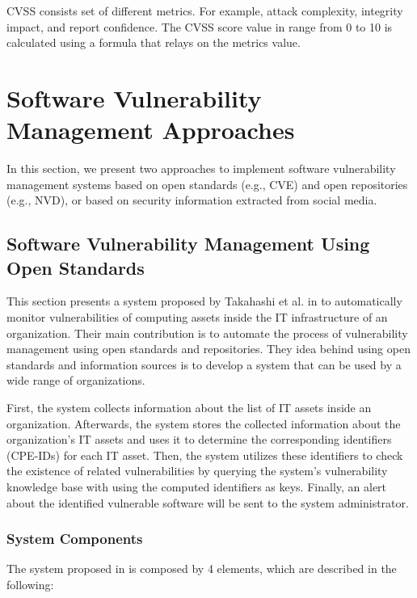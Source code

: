 \documentclass{llncs}
\begin{document}
 \par CVSS consists set of different metrics. For example, attack complexity, integrity impact, and report confidence. The CVSS score value in range from 0 to 10  is calculated using a formula that relays on the metrics value.

\section{Software	Vulnerability	Management	Approaches}
 
 In this section, we present two approaches to implement software vulnerability management systems based on  open standards (e.g., CVE) and open repositories (e.g., NVD), or based on  security information extracted from social media.
\subsection{Software	Vulnerability	Management	Using	Open	Standards}

\par This section presents a system proposed by Takahashi et al. in \cite{paper1} to automatically monitor vulnerabilities of computing assets inside the IT infrastructure of an organization. Their main contribution is to automate the process of vulnerability management using open standards and repositories. They idea behind using open standards and information sources is to develop a system that can be used  by a wide range of organizations.
\par
 First, the system collects information about the list of IT assets inside an organization. Afterwards, the system stores the collected information about the organization's IT assets and uses it to determine the corresponding  identifiers (CPE-IDs) for each IT asset. Then, the system utilizes these identifiers to check the existence of related vulnerabilities by querying the system's vulnerability knowledge base with using the computed identifiers as keys. Finally, an alert about the identified vulnerable software will be sent to the system administrator.
    
\subsubsection {System Components }

\begin{flushleft}
 The system proposed in \cite{paper1} is composed by 4 elements, which are described in the following:
\end{flushleft}
\end{document}
